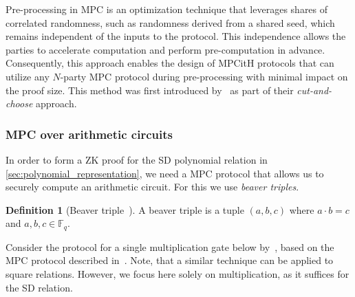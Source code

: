 \documentclass[twoside,11pt]{report}
\theoremstyle{definition}
\newtheorem{definition}{Definition}[section]
\theoremstyle{plain}
\begin{document}
Pre-processing in MPC is an optimization technique that leverages shares of correlated randomness, such as randomness derived from a shared seed, which remains independent of the inputs to the protocol. This independence allows the parties to accelerate computation and perform pre-computation in advance. Consequently, this approach enables the design of MPCitH protocols that can utilize any $N$-party MPC protocol during pre-processing with minimal impact on the proof size. This method was first introduced by~\cite{katz2018improved} as part of their \textit{cut-and-choose} approach.

\subsubsection{MPC over arithmetic circuits}\label{sec:zk-arithmetic-mpc-circuits}

In order to form a ZK proof for the SD polynomial relation in \autoref{sec:polynomial_representation}, we need a MPC protocol that allows us to securely compute an arithmetic circuit. For this we use \textit{beaver triples}.

\begin{definition}[Beaver triple~\cite{beaver1992efficient}]\label{def:beaver}
  A beaver triple is a tuple $(a, b, c)$ where $a \cdot b = c$ and $a, b, c \in \mathbb{F}_q$.
\end{definition}

Consider the protocol for a single multiplication gate below by~\cite{baum2020concretely}, based on the MPC protocol described in~\cite{damgaard2012multiparty}. Note, that a similar technique can be applied to square relations. However, we focus here solely on multiplication, as it suffices for the SD relation.
\end{document}
